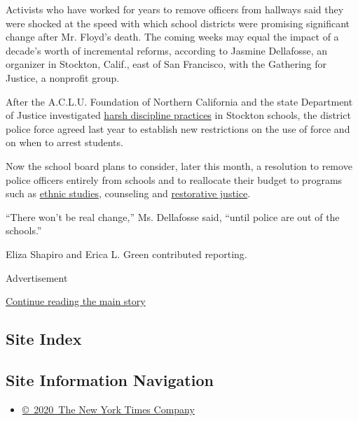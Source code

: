 Activists who have worked for years to remove officers from hallways
said they were shocked at the speed with which school districts were
promising significant change after Mr. Floyd's death. The coming weeks
may equal the impact of a decade's worth of incremental reforms,
according to Jasmine Dellafosse, an organizer in Stockton, Calif., east
of San Francisco, with the Gathering for Justice, a nonprofit group.

After the A.C.L.U. Foundation of Northern California and the state
Department of Justice investigated
\href{https://www.aclunc.org/our-work/legal-docket/aclu-northern-california-v-stockton-unified-school-district-school-prison}{harsh
discipline practices} in Stockton schools, the district police force
agreed last year to establish new restrictions on the use of force and
on when to arrest students.

Now the school board plans to consider, later this month, a resolution
to remove police officers entirely from schools and to reallocate their
budget to programs such as
\href{https://www.nytimes3xbfgragh.onion/2019/08/15/us/california-ethnic-studies.html}{ethnic
studies}, counseling and
\href{https://www.nytimes3xbfgragh.onion/2013/04/04/education/restorative-justice-programs-take-root-in-schools.html}{restorative
justice}.

``There won't be real change,'' Ms. Dellafosse said, ``until police are
out of the schools.''

Eliza Shapiro and Erica L. Green contributed reporting.

Advertisement

\protect\hyperlink{after-bottom}{Continue reading the main story}

\hypertarget{site-index}{%
\subsection{Site Index}\label{site-index}}

\hypertarget{site-information-navigation}{%
\subsection{Site Information
Navigation}\label{site-information-navigation}}

\begin{itemize}
\tightlist
\item
  \href{https://help.nytimes3xbfgragh.onion/hc/en-us/articles/115014792127-Copyright-notice}{©~2020~The
  New York Times Company}
\end{itemize}

